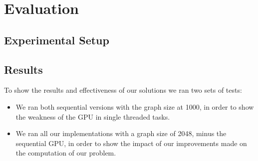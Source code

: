 \documentclass[conference]{IEEEtran}
\begin{document}
\section{Evaluation}

\subsection{Experimental Setup}


\subsection{Results}

To show the results and effectiveness of our solutions we ran two sets of tests:
\begin{itemize}
	\item We ran both sequential versions with the graph size at 1000, in order to show the weakness of the GPU in single threaded tasks.
	\item We ran all our implementations with a graph size of 2048, minus the sequential GPU, in order to show the impact of our improvements made on the computation of our problem.
\end{itemize}
\end{document}
